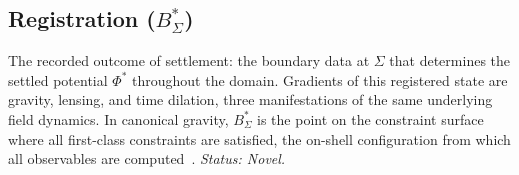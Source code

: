 \documentclass[aps,prd,preprint,superscriptaddress,showpacs,preprintnumbers,amsmath,amssymb,nofootinbib]{revtex4-2}
\begin{document}
\subsection*{Registration ($B^{*}_{\Sigma}$)}

The recorded outcome of settlement: the boundary data at $\Sigma$ that determines the settled potential $\Phi^{*}$ throughout the domain. Gradients of this registered state are gravity, lensing, and time dilation, three manifestations of the same underlying field dynamics. In canonical gravity, $B^{*}_{\Sigma}$ is the point on the constraint surface where all first-class constraints are satisfied, the on-shell configuration from which all observables are computed~\cite{dirac1964,henneaux1992}. \emph{Status: Novel.}

\end{document}
